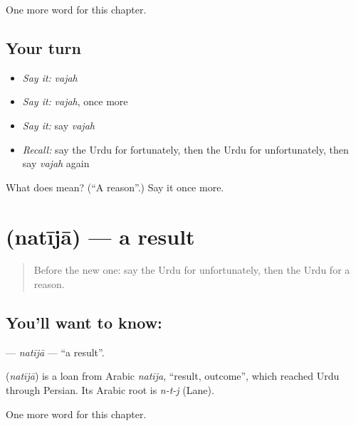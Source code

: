 \begin{grammarlens}[title={What you've built}]
One more word for this chapter.
\end{grammarlens}

\subsection*{Your turn}
\begin{itemize}
\raggedright
  \item \emph{Say it:} \emph{vajah}
  \item \emph{Say it:} \emph{vajah}, once more
  \item \emph{Say it:} say \emph{vajah}
  \item \emph{Recall:} say the Urdu for fortunately, then the Urdu for unfortunately, then say \emph{vajah} again
\end{itemize}

\begin{tcolorbox}[breakable,colback=teal!4,colframe=teal!35!black,title={Before you move on}]
What does  mean? (\textquotedblleft{}A reason\textquotedblright{}.) Say it once more.
\end{tcolorbox}
\section[\texorpdfstring{\ur{نتیجہ} (natījā)}{نتیجہ (natījā)}]{ (natījā) — a result}

\label{lesson:UR-C220-natija}



\begin{quote}
Before the new one: say the Urdu for unfortunately, then the Urdu for a reason.
\end{quote}

\subsection*{You'll want to know: }
\textbf{} — \emph{natījā} — \textquotedblleft{}a result\textquotedblright{}.

\begin{cousinweb}
\textbf{} (\emph{natījā}) is a loan from Arabic \emph{natīja}, \textquotedblleft{}result, outcome\textquotedblright{}, which reached Urdu through Persian. Its Arabic root is \emph{n-t-j} (Lane).
\end{cousinweb}

\begin{grammarlens}[title={What you've built}]
One more word for this chapter.
\end{grammarlens}


